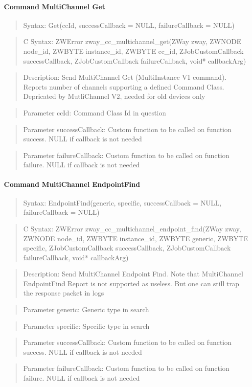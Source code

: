 \paragraph{Command MultiChannel Get}
\begin{quote}Syntax: Get(ccId, successCallback = NULL, failureCallback = NULL)\end{quote}
\begin{quote}C Syntax: ZWError zway\_cc\_multichannel\_get(ZWay zway, ZWNODE node\_id, ZWBYTE instance\_id, ZWBYTE cc\_id, ZJobCustomCallback successCallback, ZJobCustomCallback failureCallback, void* callbackArg)\end{quote}
\begin{quote}Description: Send MultiChannel Get (MultiInstance V1 command). Reports number of channels supporting a defined Command Class. Depricated by MutliChannel V2, needed for old devices only\end{quote}
\begin{quote}Parameter ccId: Command Class Id in question\end{quote}
\begin{quote}Parameter successCallback: Custom function to be called on function success. NULL if callback is not needed\end{quote}
\begin{quote}Parameter failureCallback: Custom function to be called on function failure. NULL if callback is not needed\end{quote}


\paragraph{Command MultiChannel EndpointFind}
\begin{quote}Syntax: EndpointFind(generic, specific, successCallback = NULL, failureCallback = NULL)\end{quote}
\begin{quote}C Syntax: ZWError zway\_cc\_multichannel\_endpoint\_find(ZWay zway, ZWNODE node\_id, ZWBYTE instance\_id, ZWBYTE generic, ZWBYTE specific, ZJobCustomCallback successCallback, ZJobCustomCallback failureCallback, void* callbackArg)\end{quote}
\begin{quote}Description: Send MultiChannel Endpoint Find. Note that MultiChannel EndpointFind Report is not supported as useless. But one can still trap the response packet in logs\end{quote}
\begin{quote}Parameter generic: Generic type in search\end{quote}
\begin{quote}Parameter specific: Specific type in search\end{quote}
\begin{quote}Parameter successCallback: Custom function to be called on function success. NULL if callback is not needed\end{quote}
\begin{quote}Parameter failureCallback: Custom function to be called on function failure. NULL if callback is not needed\end{quote}


